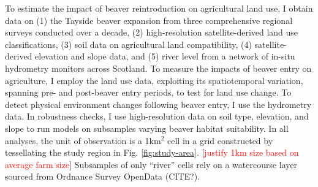 To estimate the impact of beaver reintroduction on agricultural land use, I obtain data on (1) the Tayside beaver expansion from three comprehensive regional surveys conducted over a decade, (2) high-resolution satellite-derived land use classifications, (3) soil data on agricultural land compatibility, (4) satellite-derived elevation and slope data, and (5) river level from a network of in-situ hydrometry monitors across Scotland. To measure the impacts of beaver entry on agriculture, I employ the land use data, exploiting its spatiotemporal variation, spanning pre- and post-beaver entry periods, to test for land use change. To detect physical environment changes following beaver entry, I use the hydrometry data. In robustness checks, I use high-resolution data on soil type, elevation, and slope to run models on subsamples varying beaver habitat suitability. In all analyses, the unit of observation is a 1km$^2$ cell in a grid constructed by tessellating the study region in Fig. \ref{fig:study-area}. [\textcolor{red}{justify 1km size based on average farm size}] Subsamples of only ``river'' cells rely on a watercourse layer sourced from Ordnance Survey OpenData (CITE?).

